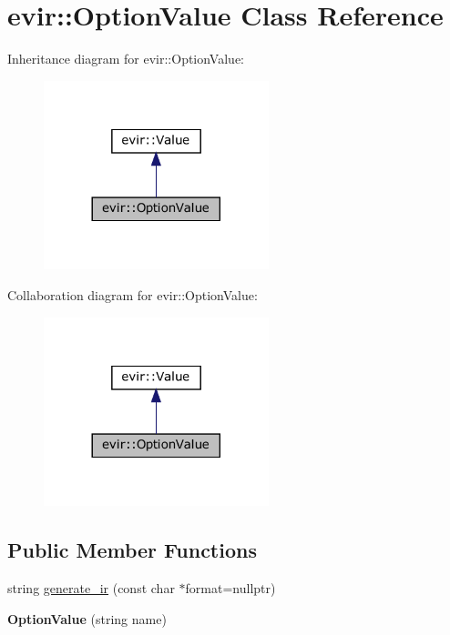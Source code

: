 \hypertarget{classevir_1_1OptionValue}{}\section{evir\+:\+:Option\+Value Class Reference}
\label{classevir_1_1OptionValue}


Inheritance diagram for evir\+:\+:Option\+Value\+:\nopagebreak
\begin{figure}[H]
\begin{center}
\leavevmode
\includegraphics[width=185pt]{classevir_1_1OptionValue__inherit__graph}
\end{center}
\end{figure}


Collaboration diagram for evir\+:\+:Option\+Value\+:\nopagebreak
\begin{figure}[H]
\begin{center}
\leavevmode
\includegraphics[width=185pt]{classevir_1_1OptionValue__coll__graph}
\end{center}
\end{figure}
\subsection*{Public Member Functions}
\begin{DoxyCompactItemize}
\item 
string \hyperlink{classevir_1_1OptionValue_a8bd21c46fc29805637eed4473f1fa371}{generate\+\_\+ir} (const char $\ast$format=nullptr)
\item 
\mbox{\label{classevir_1_1OptionValue_aa1747703bb1bb354c6dc8c0b7d5b0766}} 
{\bfseries Option\+Value} (string name)
\end{DoxyCompactItemize}
